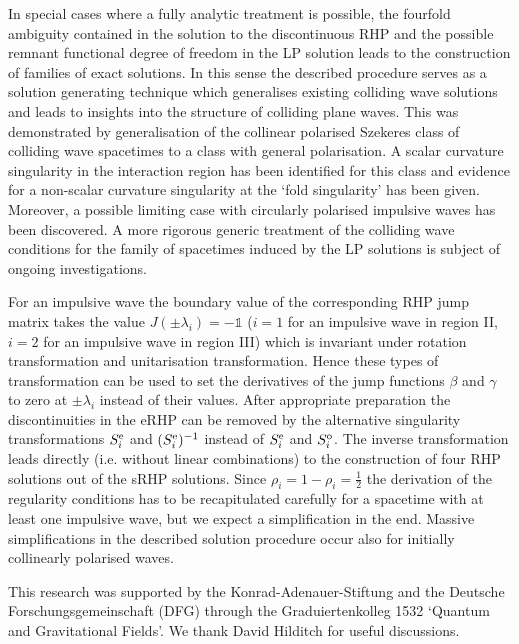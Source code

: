 \documentclass[12pt]{iopart}
\begin{document}
In special cases where a fully analytic treatment is possible, the fourfold ambiguity contained in the solution to the discontinuous RHP and the possible remnant functional degree of freedom in the LP solution leads to the construction of families of exact solutions. In this sense the described procedure serves as a solution generating technique which generalises existing colliding wave solutions and leads to insights into the structure of colliding plane waves. This was demonstrated by generalisation of the collinear polarised Szekeres class of colliding wave spacetimes to a class with general polarisation. A scalar curvature singularity in the interaction region has been identified for this class and evidence for a non-scalar curvature singularity at the `fold singularity' has been given. Moreover, a possible limiting case with circularly polarised impulsive waves has been discovered. A more rigorous generic treatment of the colliding wave conditions for the family of spacetimes induced by the LP solutions is subject of ongoing investigations.

For an impulsive wave the boundary value of the corresponding RHP jump matrix takes the value $J(\pm\lambda_i)=-\mathbb{1}$ ($i=1$ for an impulsive wave in region II, $i=2$ for an impulsive wave in region III) which is invariant under rotation transformation and unitarisation transformation. Hence these types of transformation can be used to set the derivatives of the jump functions $\beta$ and $\gamma$ to zero at $\pm\lambda_i$ instead of their values. After  appropriate preparation the discontinuities in the eRHP can be removed by the alternative singularity transformations $S_{i}^{\rm e}$ and $(S_{i}^{\rm e})^{-1}$ instead of $S_{i}^{\rm e}$ and $S_{i}^{\rm o}$.  The inverse transformation leads directly (i.e. without linear combinations) to the construction of four RHP solutions out of the sRHP solutions. Since $\rho_i=1-\rho_i=\frac12$ the derivation of the regularity conditions has to be recapitulated carefully for a spacetime with at least one impulsive wave, but we expect a simplification in the end. Massive simplifications in the described solution procedure occur also for  initially collinearly polarised waves. 

\ack
This research was supported by the Konrad-Adenauer-Stiftung and the Deutsche Forschungsgemeinschaft (DFG) through the Graduiertenkolleg 1532 `Quantum and Gravitational Fields'. We thank David Hilditch for useful discussions.

\newpage
\end{document}
